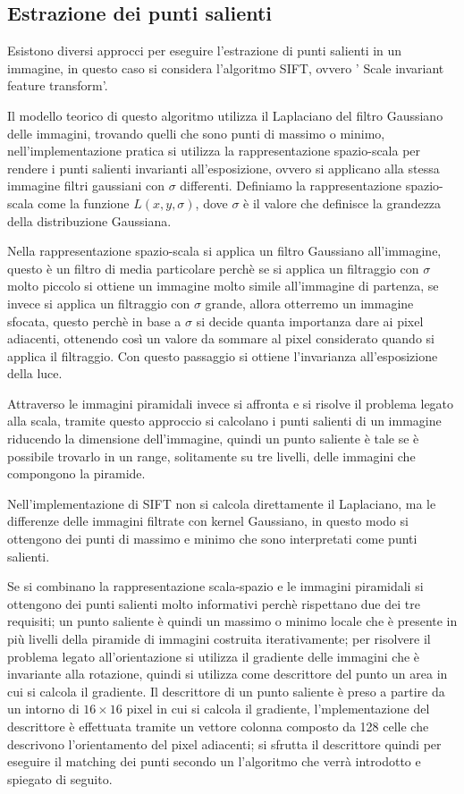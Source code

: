 \documentclass[11pt, oneside]{article}   	%
\begin{document}
\subsection{Estrazione dei punti salienti}
Esistono diversi approcci per eseguire l'estrazione di punti salienti in un immagine, in questo caso si considera l'algoritmo SIFT,
ovvero ' Scale invariant feature transform'.




Il modello teorico di questo algoritmo utilizza il Laplaciano del filtro Gaussiano delle immagini, trovando quelli che sono punti di massimo o minimo, nell'implementazione pratica si utilizza 
la rappresentazione spazio-scala per rendere i punti salienti invarianti all'esposizione, ovvero si applicano alla stessa immagine filtri gaussiani con $\sigma$ differenti. 
Definiamo la rappresentazione spazio-scala come la funzione $L(x,y,\sigma)$, dove $\sigma$ è il valore che definisce la grandezza della distribuzione Gaussiana.

Nella rappresentazione spazio-scala si applica un filtro Gaussiano all'immagine, questo è un filtro di media particolare perchè se si applica un filtraggio con $\sigma$ molto piccolo si ottiene un immagine molto simile all'immagine di partenza,
se invece si applica un filtraggio con $\sigma$ grande, allora otterremo un immagine sfocata, questo perchè in base a $\sigma$ si
decide quanta importanza dare ai pixel adiacenti, ottenendo così un valore da sommare al pixel considerato quando si applica il filtraggio.
Con questo passaggio si ottiene l'invarianza all'esposizione della luce.

Attraverso le immagini piramidali invece si affronta e si risolve il problema legato alla scala, tramite questo approccio si calcolano i punti salienti di un immagine riducendo la dimensione dell'immagine,
quindi un punto saliente è tale se è possibile trovarlo in un range, solitamente su tre livelli, delle immagini che compongono la piramide.


Nell'implementazione di SIFT non si calcola direttamente il Laplaciano, ma le differenze delle immagini filtrate con kernel Gaussiano, in questo modo si ottengono dei punti di massimo e minimo che sono interpretati come punti salienti.


Se si combinano la rappresentazione scala-spazio e le immagini piramidali si ottengono dei punti salienti molto informativi perchè rispettano due dei tre requisiti;
un punto saliente è quindi un massimo o minimo locale che è presente in più livelli della piramide di immagini costruita iterativamente;
per risolvere il problema legato all'orientazione si utilizza il gradiente delle immagini che è invariante alla rotazione, quindi si utilizza come descrittore del punto un area  in cui si calcola il gradiente.
Il descrittore di un punto saliente è preso a partire da un intorno di $16 \times 16$ pixel in cui si calcola il gradiente, l'mplementazione del descrittore è effettuata tramite un vettore  colonna composto da 128 celle che descrivono l'orientamento del pixel adiacenti;
si sfrutta il descrittore quindi per eseguire il matching dei punti secondo un l'algoritmo che verrà introdotto e spiegato di seguito.
\end{document}
